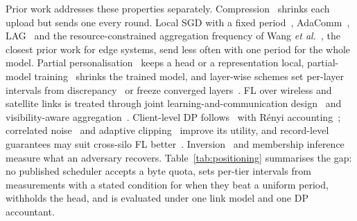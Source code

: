 Prior work addresses these properties separately. Compression~\cite{alistarh2017qsgd,sattler2020} shrinks each upload but sends one every round. Local SGD with a fixed period~\cite{stich2019,wang2021coop,lin2020postlocal}, AdaComm~\cite{wang2019adacomm}, LAG~\cite{chen2018lag} and the resource-constrained aggregation frequency of Wang \emph{et al.}~\cite{wang2019jsac}, the closest prior work for edge systems, send less often with one period for the whole model. Partial personalisation~\cite{arivazhagan2019,collins2021,pillutla2022,yang2024fedas} keeps a head or a representation local, partial-model training~\cite{diao2021heterofl,horvath2021fjord} shrinks the trained model, and layer-wise schemes set per-layer intervals from discrepancy~\cite{lee2023fedlama} or freeze converged layers~\cite{malan2024alf}. FL over wireless and satellite links is treated through joint learning-and-communication design~\cite{chen2021joint} and visibility-aware aggregation~\cite{razmi2022leo}. Client-level DP follows~\cite{mcmahan2018dp} with R\'enyi accounting~\cite{mironov2017,mironov2019sgm}; correlated noise~\cite{kairouz2021ftrl,choquette2024correlated} and adaptive clipping~\cite{andrew2021adaptive} improve its utility, and record-level guarantees may suit cross-silo FL better~\cite{liu2022crosssilo,liu2024recordlevel}. Inversion~\cite{zhu2019dlg,geiping2020,vero2023tableak} and membership inference~\cite{yeom2018,carlini2022lira} measure what an adversary recovers. Table~\ref{tab:positioning} summarises the gap: no published scheduler accepts a byte quota, sets per-tier intervals from measurements with a stated condition for when they beat a uniform period, withholds the head, and is evaluated under one link model and one DP accountant.


